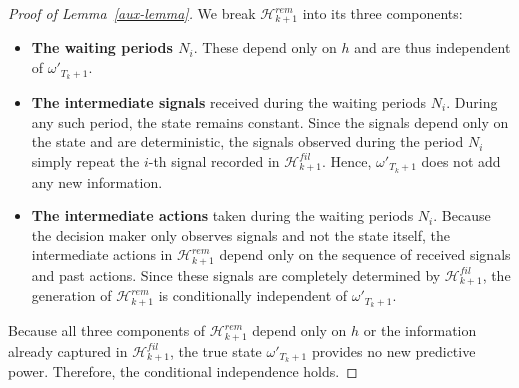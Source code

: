\documentclass[english,openary,11pt]{article}
\theoremstyle{definition}
\begin{document}
\begin{proof}[Proof of Lemma~\ref{aux-lemma}]

We break $\mathcal{H}_{k+1}^{rem}$ into its three components:

\begin{itemize}
	\item \textbf{The waiting periods $N_{i}$}. These depend only on $h$ and are thus independent of $\omega'_{T_{k}+1}$. 
	\item \textbf{The intermediate signals} received during the waiting periods $N_{i}$. During any such period, the state remains constant.
Since the signals depend only on the state and are deterministic, the signals observed during the period $N_i$ simply repeat the $i$-th signal recorded in $\mathcal{H}_{k+1}^{fil}$. Hence, $\omega'_{T_{k}+1}$ does not add any new information.
	\item \textbf{The intermediate actions} taken during the waiting periods $N_{i}$. Because the decision maker only observes signals and not the state itself, the intermediate actions in $\mathcal H^{rem}_{k+1}$ depend only on the sequence of received signals and past actions. Since these signals are completely determined by $\mathcal{H}_{k+1}^{fil}$, the generation of $\mathcal H^{rem}_{k+1}$ is conditionally independent of $\omega'_{T_{k}+1}$.
\end{itemize}
Because all three components of $\mathcal{H}_{k+1}^{rem}$ depend only on $h$ or the information already captured in $\mathcal{H}_{k+1}^{fil}$, the true state $\omega'_{T_{k}+1}$ provides no new predictive power. Therefore, the conditional independence holds.
\end{proof}
\end{document}
